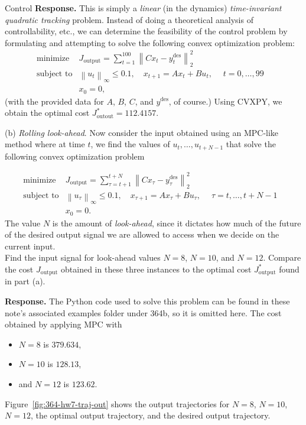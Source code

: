 \begin{chapter}{Control}
    \vspace{.1cm}
    \noindent \textbf{Response.} This is simply a \textit{linear} (in the dynamics) \textit{time-invariant quadratic tracking} problem.
    Instead of doing a theoretical analysis of controllability, etc., we can determine the feasibility
    of the control problem by formulating and attempting to solve the following convex optimization problem:
    \[\begin{array}{lll}
    \text{minimize} \; & J_{\text{output}} = \sum_{t=1}^{100}\left\lVert Cx_t - y_t^{\text{des}} \right\rVert_{2}^2 & \\
    \text{subject to} & \left\lVert u_t \right\rVert_{\infty} \le 0.1, \quad x_{t+1} = Ax_t + Bu_t, \; \quad t = 0, \ldots, 99 & \\
    &x_0 = 0,
    \end{array}\]
    (with the provided data for $A$, $B$, $C$, and $y^{\text{des}}$, of course.) Using CVXPY, we obtain the optimal cost 
    $J_{\text{outout}}^{*} = 112.4157$.

    \vspace{.1cm}
    \noindent (b) \textit{Rolling look-ahead}. Now consider the input obtained using an MPC-like method
    where at time $t$, we find the values of $u_t, \ldots, u_{t+N-1}$ that solve the following convex optimization
    problem

    \[\begin{array}{lll}
        \text{minimize} \; & J_{\text{output}} =  \sum_{\tau=t+1}^{t+N}\left\lVert Cx_\tau - y_\tau^{\text{des}} \right\rVert_{2}^2 & \\
        \text{subject to} & \left\lVert u_\tau \right\rVert_{\infty} \le 0.1, \quad x_{\tau+1} = Ax_\tau + Bu_\tau, \; \quad \tau = t, \ldots, t + N - 1 & \\
        &x_0 = 0.
        \end{array}\]
    The value $N$ is the amount of \textit{look-ahead}, since it dictates how much of the future of the desired
    output signal we are allowed to access when we decide on the current input.\\
    Find the input signal for look-ahead values $N=8$, $N=10$, and $N=12$. Compare the cost $J_{\text{output}}$
    obtained in these three instances to the optimal cost $J_{\text{output}}^{*}$ found in part (a).
    
    \vspace{.1cm} 
    \noindent \textbf{Response.} The Python code used to solve this problem can be found in these note's associated examples folder under 364b,
    so it is omitted here. The cost obtained by applying MPC with 
    \begin{itemize}
        \item $N = 8$ is $379.634$,
        \item $N = 10$ is $128.13$,
        \item and $N=12$ is $123.62$.
    \end{itemize}
    Figure~\ref{fig:364-hw7-traj-out} shows the output trajectories for $N=8$, $N=10$, $N=12$,
    the optimal output trajectory, and the desired output trajectory.


\end{chapter}
